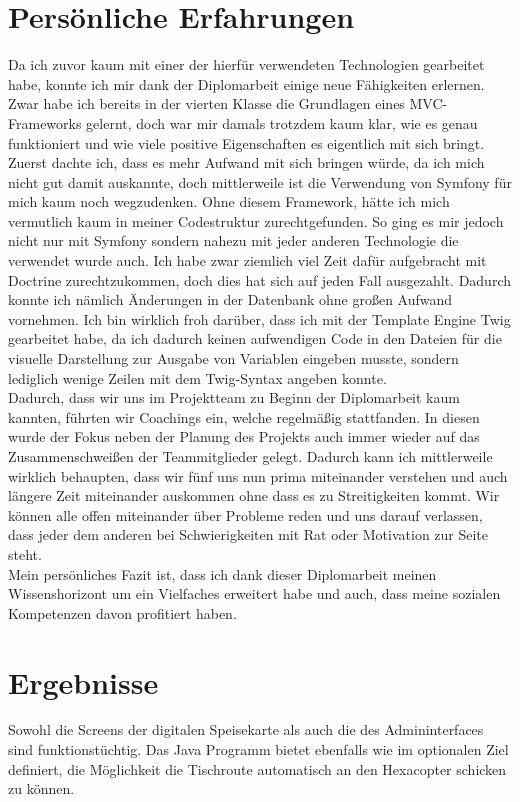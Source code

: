 \section{Persönliche Erfahrungen}
Da ich zuvor kaum mit einer der hierfür verwendeten Technologien gearbeitet habe, konnte ich mir dank der Diplomarbeit einige neue Fähigkeiten erlernen.
Zwar habe ich bereits in der vierten Klasse die Grundlagen eines MVC-Frameworks gelernt, doch war mir damals trotzdem kaum klar, wie es genau funktioniert und wie viele positive Eigenschaften es eigentlich mit sich bringt.
Zuerst dachte ich, dass es mehr Aufwand mit sich bringen würde, da ich mich nicht gut damit auskannte, doch mittlerweile ist die Verwendung von Symfony für mich kaum noch wegzudenken. Ohne diesem Framework, hätte ich mich vermutlich kaum in meiner Codestruktur zurechtgefunden.
So ging es mir jedoch nicht nur mit Symfony sondern nahezu mit jeder anderen Technologie die verwendet wurde auch.
Ich habe zwar ziemlich viel Zeit dafür aufgebracht mit Doctrine zurechtzukommen, doch dies hat sich auf jeden Fall ausgezahlt. Dadurch konnte ich nämlich Änderungen in der Datenbank ohne großen Aufwand vornehmen.
Ich bin wirklich froh darüber, dass ich mit der Template Engine Twig gearbeitet habe, da ich dadurch keinen aufwendigen Code in den Dateien für die visuelle Darstellung zur Ausgabe von Variablen eingeben musste, sondern lediglich wenige Zeilen mit dem Twig-Syntax angeben konnte.
\\
Dadurch, dass wir uns im Projektteam zu Beginn der Diplomarbeit kaum kannten, führten wir Coachings ein, welche regelmäßig stattfanden. In diesen wurde der Fokus neben der Planung des Projekts auch immer wieder auf das Zusammenschweißen der Teammitglieder gelegt. Dadurch kann ich mittlerweile wirklich behaupten, dass wir fünf uns nun prima miteinander verstehen und auch längere Zeit miteinander auskommen ohne dass es zu Streitigkeiten kommt. Wir können alle offen miteinander über Probleme reden und uns darauf verlassen, dass jeder dem anderen bei Schwierigkeiten mit Rat oder Motivation zur Seite steht.
\\
Mein persönliches Fazit ist, dass ich dank dieser Diplomarbeit meinen Wissenshorizont um ein Vielfaches erweitert habe und auch, dass meine sozialen Kompetenzen davon profitiert haben.

\section{Ergebnisse}
Sowohl die Screens der digitalen Speisekarte als auch die des Admininterfaces sind funktionstüchtig.
Das Java Programm bietet ebenfalls wie im optionalen Ziel definiert, die Möglichkeit die Tischroute automatisch an den Hexacopter schicken zu können.
